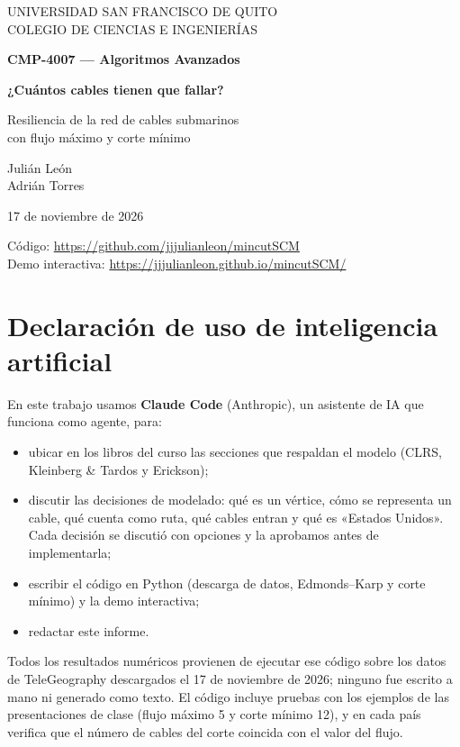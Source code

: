 \documentclass[11pt,a4paper]{article}
\begin{document}
\begin{titlepage}
\centering
{\large UNIVERSIDAD SAN FRANCISCO DE QUITO\\COLEGIO DE CIENCIAS E INGENIERÍAS\par}
\vspace{0.8cm}
{\large\bfseries CMP-4007 --- Algoritmos Avanzados\par}
\vspace{4cm}
{\LARGE\bfseries ¿Cuántos cables tienen que fallar?\par}
\vspace{0.4cm}
{\large Resiliencia de la red de cables submarinos\\con flujo máximo y corte mínimo\par}
\vspace{4cm}
{\large Julián León\\Adrián Torres\par}
\vspace{0.6cm}
{17 de noviembre de 2026\par}
\vfill
{\small Código: \url{https://github.com/jjjulianleon/mincutSCM}\\
Demo interactiva: \url{https://jjjulianleon.github.io/mincutSCM/}\par}
\end{titlepage}

\section*{Declaración de uso de inteligencia artificial}
En este trabajo usamos \textbf{Claude Code} (Anthropic), un asistente de IA que funciona como agente, para:
\begin{itemize}
  \item ubicar en los libros del curso las secciones que respaldan el modelo (CLRS, Kleinberg \& Tardos y Erickson);
  \item discutir las decisiones de modelado: qué es un vértice, cómo se representa un cable, qué cuenta como ruta, qué cables entran y qué es «Estados Unidos». Cada decisión se discutió con opciones y la aprobamos antes de implementarla;
  \item escribir el código en Python (descarga de datos, Edmonds--Karp y corte mínimo) y la demo interactiva;
  \item redactar este informe.
\end{itemize}
Todos los resultados numéricos provienen de ejecutar ese código sobre los datos de TeleGeography descargados el 17 de noviembre de 2026; ninguno fue escrito a mano ni generado como texto. El código incluye pruebas con los ejemplos de las presentaciones de clase (flujo máximo 5 y corte mínimo 12), y en cada país verifica que el número de cables del corte coincida con el valor del flujo.
\end{document}
